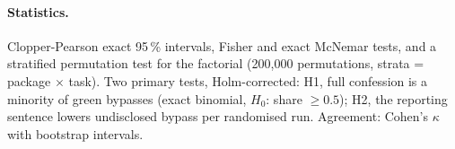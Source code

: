 \paragraph{Statistics.} Clopper-Pearson exact 95\,\% intervals, Fisher and exact McNemar tests, and a stratified permutation test for the factorial (200{,}000 permutations, strata = package $\times$ task). Two primary tests, Holm-corrected: H1, full confession is a minority of green bypasses (exact binomial, $H_0$: share $\ge 0.5$); H2, the reporting sentence lowers undisclosed bypass per randomised run. Agreement: Cohen's $\kappa$ with bootstrap intervals.
